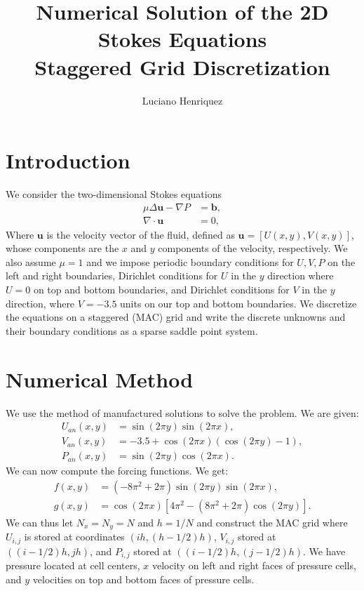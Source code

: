 \documentclass[11pt,letterpaper]{article}
\title{\vspace{-1.5cm}
    \textbf{Numerical Solution of the 2D Stokes Equations}\\
    \large Staggered Grid Discretization
}
\author{Luciano Henriquez}
\newcommand{\grad}{\nabla}
\newcommand{\lap}{\Delta}
\newcommand{\uvec}{\bm{u}}
\begin{document}
\maketitle
\vspace{-0.6cm}

\section{Introduction}

We consider the two-dimensional Stokes equations
\begin{equation}
    \begin{aligned}
        \mu \lap \uvec - \grad P &= \bm{b},\\
        \grad \cdot \uvec &= 0,
    \end{aligned}
  \end{equation}
  Where $\uvec$ is the velocity vector of the fluid, defined as $\uvec = [U(x,y),V(x,y)]$, whose components are the $x$ and $y$ components of the velocity, respectively. We also assume $\mu = 1$ and
 we impose periodic boundary conditions for $U,V,P$ on the left and right boundaries, Dirichlet conditions for $U$ in the $y$ direction where $U = 0$ on top and bottom boundaries, and Dirichlet conditions for $V$ in the $y$ direction, where $V = -3.5$ units on our top and bottom boundaries. We discretize the equations on a staggered (MAC) grid and write the discrete unknowns and their boundary conditions as a sparse saddle point system.

\section{Numerical Method}

We use the method of manufactured solutions to solve the problem. We are given:
\begin{align*}
  U_{an}(x,y) &= \sin (2\pi y)\sin (2\pi x),\\
  V_{an}(x,y) &= -3.5 + \cos (2\pi x)(\cos(2\pi y)-1), \\
  P_{an}(x,y) &= \sin (2\pi y)\cos (2\pi x).
\end{align*}
We can now compute the forcing functions. We get:
\begin{align*}
  f(x,y) &= (-8\pi ^2 +2\pi )\sin (2\pi y)\sin (2\pi x), \\
  g(x,y) &= \cos (2\pi x)[4\pi ^2 -(8\pi ^2 +2\pi )\cos(2\pi y)].
\end{align*}
We can thus let $N_{x}=N_{y}=N$ and $h=1/N$ and construct the MAC grid where $U_{i,j}$ is stored at coordinates $(ih, (h-1/2)h)$, $V_{i,j}$ stored at $((i-1/2)h, jh)$, and $P_{i,j}$ stored at $((i-1/2)h, (j-1/2)h)$. We have pressure located at cell centers, $x$ velocity on left and right faces of pressure cells, and $y$ velocities on top and bottom faces of pressure cells.
\end{document}
